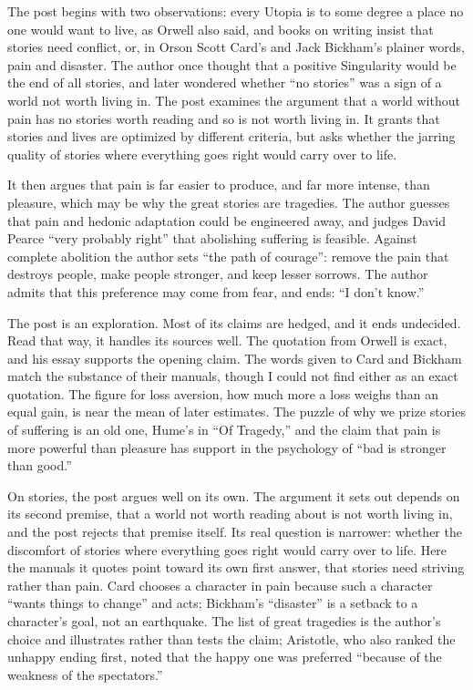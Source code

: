 \begin{afterword}
\summaryhead

The post begins with two observations: every Utopia is to some degree a place no one would want to live, as Orwell also said, and books on writing insist that stories need conflict, or, in Orson Scott Card's and Jack Bickham's plainer words, pain and disaster. The author once thought that a positive Singularity would be the end of all stories, and later wondered whether ``no stories'' was a sign of a world not worth living in. The post examines the argument that a world without pain has no stories worth reading and so is not worth living in. It grants that stories and lives are optimized by different criteria, but asks whether the jarring quality of stories where everything goes right would carry over to life.

It then argues that pain is far easier to produce, and far more intense, than pleasure, which may be why the great stories are tragedies. The author guesses that pain and hedonic adaptation could be engineered away, and judges David Pearce ``very probably right'' that abolishing suffering is feasible. Against complete abolition the author sets ``the path of courage'': remove the pain that destroys people, make people stronger, and keep lesser sorrows. The author admits that this preference may come from fear, and ends: ``I don't know.''

\responsehead

The post is an exploration. Most of its claims are hedged, and it ends undecided. Read that way, it handles its sources well. The quotation from Orwell is exact, and his essay supports the opening claim. The words given to Card and Bickham match the substance of their manuals, though I could not find either as an exact quotation. The figure for loss aversion, how much more a loss weighs than an equal gain, is near the mean of later estimates. The puzzle of why we prize stories of suffering is an old one, Hume's in ``Of Tragedy,'' and the claim that pain is more powerful than pleasure has support in the psychology of ``bad is stronger than good.''

On stories, the post argues well on its own. The argument it sets out depends on its second premise, that a world not worth reading about is not worth living in, and the post rejects that premise itself. Its real question is narrower: whether the discomfort of stories where everything goes right would carry over to life. Here the manuals it quotes point toward its own first answer, that stories need striving rather than pain. Card chooses a character in pain because such a character ``wants things to change'' and acts; Bickham's ``disaster'' is a setback to a character's goal, not an earthquake. The list of great tragedies is the author's choice and illustrates rather than tests the claim; Aristotle, who also ranked the unhappy ending first, noted that the happy one was preferred ``because of the weakness of the spectators.''


\end{afterword}
